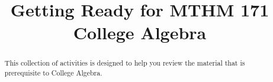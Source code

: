 \documentclass{xourse}
\title{Getting Ready for MTHM 171 College Algebra}%
\begin{document}
\begin{abstract} %

This collection of activities is designed to help you review the material that is prerequisite to College Algebra.

\end{abstract}

\maketitle


\end{document}
